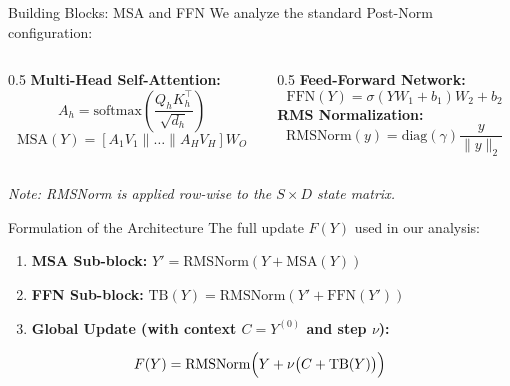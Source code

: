 \documentclass[aspectratio=169, 11pt]{beamer}
\newcommand{\RMS}{\mathrm{RMSNorm}}
\begin{document}
\begin{frame}{Building Blocks: MSA and FFN}
    We analyze the standard Post-Norm configuration:
    \vspace{1em}
    \begin{columns}
        \begin{column}{0.5\textwidth}
            \textbf{Multi-Head Self-Attention:}
            \[ A_h = \text{softmax}\left(\frac{Q_h K_h^\top}{\sqrt{d_h}}\right) \]
            \[ \text{MSA}(Y) = [A_1 V_1 \parallel \dots \parallel A_H V_H] W_O \]
        \end{column}
        \begin{column}{0.5\textwidth}
            \textbf{Feed-Forward Network:}
            \[ \text{FFN}(Y) = \sigma(Y W_1 + b_1)W_2 + b_2 \]
            \vspace{0.5em}
            \textbf{RMS Normalization:}
            \[ \RMS(y) = \text{diag}(\gamma) \frac{y}{\|y\|_2} \]
        \end{column}
    \end{columns}
    \vspace{1em}
    \textit{Note: RMSNorm is applied row-wise to the $S \times D$ state matrix.}
\end{frame}

\begin{frame}{Formulation of the Architecture}
    The full update $F(Y)$ used in our analysis:
    \begin{enumerate}
        \item \textbf{MSA Sub-block:} $Y' = \RMS(Y + \text{MSA}(Y))$
        \item \textbf{FFN Sub-block:} $\text{TB}(Y) = \RMS(Y' + \text{FFN}(Y'))$
        \item \textbf{Global Update (with context $C=Y^{(0)}$ and step $\nu$):}
    \end{enumerate}
    \[ F(Y) = \RMS\Bigl(Y + \nu \bigl(C + \text{TB}(Y)\bigr)\Bigr) \]

\end{frame}
\end{document}
